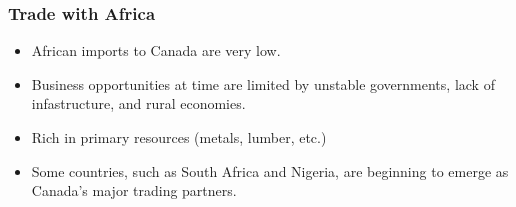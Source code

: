 \subsubsection{Trade with Africa}

\begin{itemize}
    \item African imports to Canada are very low.
    \item Business opportunities at time are limited by unstable governments, lack of infastructure, and rural economies.
    \item Rich in primary resources (metals, lumber, etc.)
    \item Some countries, such as South Africa and Nigeria, are beginning to emerge as Canada's major trading partners.
\end{itemize}

\pagebreak

